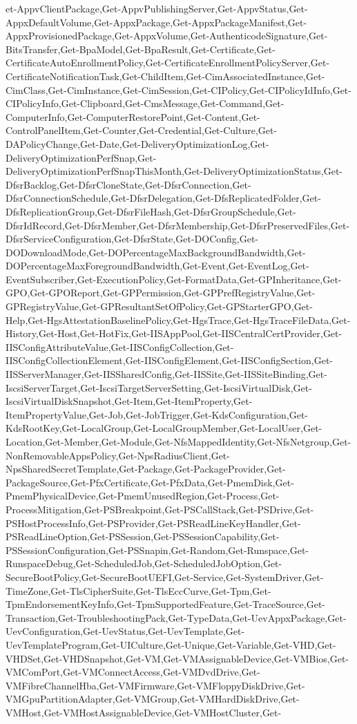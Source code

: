 {{et-AppvClientPackage,Get-AppvPublishingServer,Get-AppvStatus,Get-AppxDefaultVolume,Get-AppxPackage,Get-AppxPackageManifest,Get-AppxProvisionedPackage,Get-AppxVolume,Get-AuthenticodeSignature,Get-BitsTransfer,Get-BpaModel,Get-BpaResult,Get-Certificate,Get-CertificateAutoEnrollmentPolicy,Get-CertificateEnrollmentPolicyServer,Get-CertificateNotificationTask,Get-ChildItem,Get-CimAssociatedInstance,Get-CimClass,Get-CimInstance,Get-CimSession,Get-CIPolicy,Get-CIPolicyIdInfo,Get-CIPolicyInfo,Get-Clipboard,Get-CmsMessage,Get-Command,Get-ComputerInfo,Get-ComputerRestorePoint,Get-Content,Get-ControlPanelItem,Get-Counter,Get-Credential,Get-Culture,Get-DAPolicyChange,Get-Date,Get-DeliveryOptimizationLog,Get-DeliveryOptimizationPerfSnap,Get-DeliveryOptimizationPerfSnapThisMonth,Get-DeliveryOptimizationStatus,Get-DfsrBacklog,Get-DfsrCloneState,Get-DfsrConnection,Get-DfsrConnectionSchedule,Get-DfsrDelegation,Get-DfsReplicatedFolder,Get-DfsReplicationGroup,Get-DfsrFileHash,Get-DfsrGroupSchedule,Get-DfsrIdRecord,Get-DfsrMember,Get-DfsrMembership,Get-DfsrPreservedFiles,Get-DfsrServiceConfiguration,Get-DfsrState,Get-DOConfig,Get-DODownloadMode,Get-DOPercentageMaxBackgroundBandwidth,Get-DOPercentageMaxForegroundBandwidth,Get-Event,Get-EventLog,Get-EventSubscriber,Get-ExecutionPolicy,Get-FormatData,Get-GPInheritance,Get-GPO,Get-GPOReport,Get-GPPermission,Get-GPPrefRegistryValue,Get-GPRegistryValue,Get-GPResultantSetOfPolicy,Get-GPStarterGPO,Get-Help,Get-HgsAttestationBaselinePolicy,Get-HgsTrace,Get-HgsTraceFileData,Get-History,Get-Host,Get-HotFix,Get-IISAppPool,Get-IISCentralCertProvider,Get-IISConfigAttributeValue,Get-IISConfigCollection,Get-IISConfigCollectionElement,Get-IISConfigElement,Get-IISConfigSection,Get-IISServerManager,Get-IISSharedConfig,Get-IISSite,Get-IISSiteBinding,Get-IscsiServerTarget,Get-IscsiTargetServerSetting,Get-IscsiVirtualDisk,Get-IscsiVirtualDiskSnapshot,Get-Item,Get-ItemProperty,Get-ItemPropertyValue,Get-Job,Get-JobTrigger,Get-KdsConfiguration,Get-KdsRootKey,Get-LocalGroup,Get-LocalGroupMember,Get-LocalUser,Get-Location,Get-Member,Get-Module,Get-NfsMappedIdentity,Get-NfsNetgroup,Get-NonRemovableAppsPolicy,Get-NpsRadiusClient,Get-NpsSharedSecretTemplate,Get-Package,Get-PackageProvider,Get-PackageSource,Get-PfxCertificate,Get-PfxData,Get-PmemDisk,Get-PmemPhysicalDevice,Get-PmemUnusedRegion,Get-Process,Get-ProcessMitigation,Get-PSBreakpoint,Get-PSCallStack,Get-PSDrive,Get-PSHostProcessInfo,Get-PSProvider,Get-PSReadLineKeyHandler,Get-PSReadLineOption,Get-PSSession,Get-PSSessionCapability,Get-PSSessionConfiguration,Get-PSSnapin,Get-Random,Get-Runspace,Get-RunspaceDebug,Get-ScheduledJob,Get-ScheduledJobOption,Get-SecureBootPolicy,Get-SecureBootUEFI,Get-Service,Get-SystemDriver,Get-TimeZone,Get-TlsCipherSuite,Get-TlsEccCurve,Get-Tpm,Get-TpmEndorsementKeyInfo,Get-TpmSupportedFeature,Get-TraceSource,Get-Transaction,Get-TroubleshootingPack,Get-TypeData,Get-UevAppxPackage,Get-UevConfiguration,Get-UevStatus,Get-UevTemplate,Get-UevTemplateProgram,Get-UICulture,Get-Unique,Get-Variable,Get-VHD,Get-VHDSet,Get-VHDSnapshot,Get-VM,Get-VMAssignableDevice,Get-VMBios,Get-VMComPort,Get-VMConnectAccess,Get-VMDvdDrive,Get-VMFibreChannelHba,Get-VMFirmware,Get-VMFloppyDiskDrive,Get-VMGpuPartitionAdapter,Get-VMGroup,Get-VMHardDiskDrive,Get-VMHost,Get-VMHostAssignableDevice,Get-VMHostCluster,Get-}}
